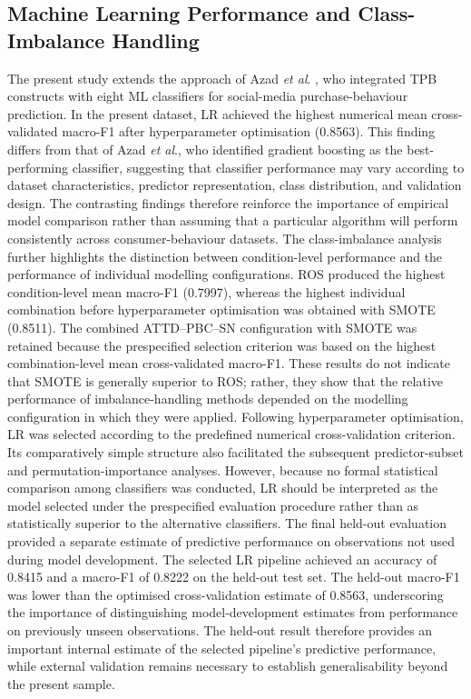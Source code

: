 \documentclass[jtaer,article,submit,moreauthors]{Definitions/mdpi}
\begin{document}
\subsection{Machine Learning Performance and Class-Imbalance Handling}

The present study extends the approach of Azad \textit{et al}.
\cite{Azad2023}, who integrated TPB constructs with eight ML classifiers
for social-media purchase-behaviour prediction. In the present dataset,
LR achieved the highest numerical mean cross-validated macro-F1 after
hyperparameter optimisation (0.8563). This finding differs from that of
Azad \textit{et al}., who identified gradient boosting as the
best-performing classifier, suggesting that classifier performance may
vary according to dataset characteristics, predictor representation,
class distribution, and validation design. The contrasting findings
therefore reinforce the importance of empirical model comparison rather
than assuming that a particular algorithm will perform consistently
across consumer-behaviour datasets.
The class-imbalance analysis further highlights the distinction between
condition-level performance and the performance of individual modelling
configurations. ROS produced the highest condition-level mean macro-F1
(0.7997), whereas the highest individual combination before
hyperparameter optimisation was obtained with SMOTE (0.8511). The
combined ATTD--PBC--SN configuration with SMOTE was retained because
the prespecified selection criterion was based on the highest
combination-level mean cross-validated macro-F1. These results do not
indicate that SMOTE is generally superior to ROS; rather, they show
that the relative performance of imbalance-handling methods depended on
the modelling configuration in which they were applied.
Following hyperparameter optimisation, LR was selected according to the
predefined numerical cross-validation criterion. Its comparatively
simple structure also facilitated the subsequent predictor-subset and
permutation-importance analyses. However, because no formal statistical
comparison among classifiers was conducted, LR should be interpreted as
the model selected under the prespecified evaluation procedure rather
than as statistically superior to the alternative classifiers.
The final held-out evaluation provided a separate estimate of predictive
performance on observations not used during model development. The
selected LR pipeline achieved an accuracy of 0.8415 and a macro-F1 of
0.8222 on the held-out test set. The held-out macro-F1 was lower than
the optimised cross-validation estimate of 0.8563, underscoring the
importance of distinguishing model-development estimates from
performance on previously unseen observations. The held-out result
therefore provides an important internal estimate of the selected
pipeline's predictive performance, while external validation remains
necessary to establish generalisability beyond the present sample.
\end{document}
